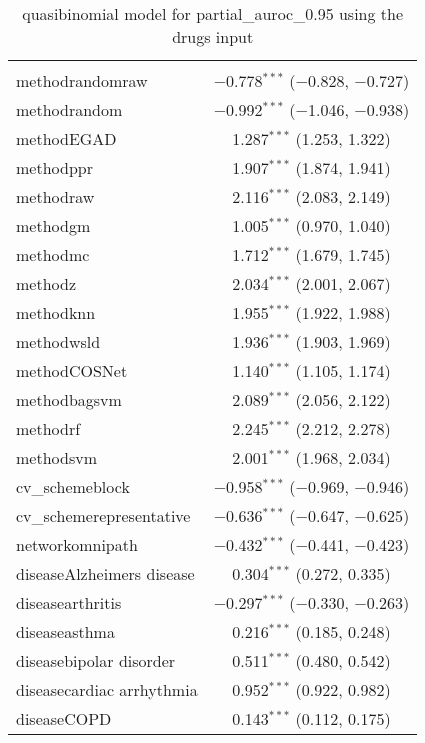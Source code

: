 
\begin{table}[!htbp] \centering 
  \caption{quasibinomial model for partial_auroc_0.95 using the drugs input} 
  \label{} 
\begin{tabular}{@{\extracolsep{5pt}}lc} 
\\[-1.8ex]\hline 
\hline \\[-1.8ex] 
 methodrandomraw & $-$0.778$^{***}$ ($-$0.828, $-$0.727) \\ 
  methodrandom & $-$0.992$^{***}$ ($-$1.046, $-$0.938) \\ 
  methodEGAD & 1.287$^{***}$ (1.253, 1.322) \\ 
  methodppr & 1.907$^{***}$ (1.874, 1.941) \\ 
  methodraw & 2.116$^{***}$ (2.083, 2.149) \\ 
  methodgm & 1.005$^{***}$ (0.970, 1.040) \\ 
  methodmc & 1.712$^{***}$ (1.679, 1.745) \\ 
  methodz & 2.034$^{***}$ (2.001, 2.067) \\ 
  methodknn & 1.955$^{***}$ (1.922, 1.988) \\ 
  methodwsld & 1.936$^{***}$ (1.903, 1.969) \\ 
  methodCOSNet & 1.140$^{***}$ (1.105, 1.174) \\ 
  methodbagsvm & 2.089$^{***}$ (2.056, 2.122) \\ 
  methodrf & 2.245$^{***}$ (2.212, 2.278) \\ 
  methodsvm & 2.001$^{***}$ (1.968, 2.034) \\ 
  cv\_schemeblock & $-$0.958$^{***}$ ($-$0.969, $-$0.946) \\ 
  cv\_schemerepresentative & $-$0.636$^{***}$ ($-$0.647, $-$0.625) \\ 
  networkomnipath & $-$0.432$^{***}$ ($-$0.441, $-$0.423) \\ 
  diseaseAlzheimers disease & 0.304$^{***}$ (0.272, 0.335) \\ 
  diseasearthritis & $-$0.297$^{***}$ ($-$0.330, $-$0.263) \\ 
  diseaseasthma & 0.216$^{***}$ (0.185, 0.248) \\ 
  diseasebipolar disorder & 0.511$^{***}$ (0.480, 0.542) \\ 
  diseasecardiac arrhythmia & 0.952$^{***}$ (0.922, 0.982) \\ 
  diseaseCOPD & 0.143$^{***}$ (0.112, 0.175) \\ 

\end{tabular}
\end{table}
